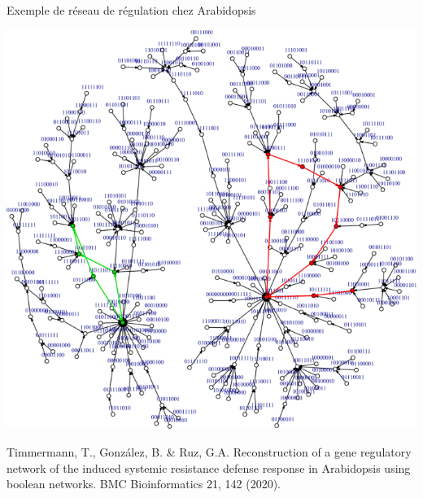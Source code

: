 \begin{frame}{Exemple de réseau de régulation chez Arabidopsis}

\begin{center}
    \includegraphics[scale = 0.27]{Figures/Intro/arabidopsis_gene_network.png} 
\end{center}

\vspace{-0.5cm}

\begin{tiny}
Timmermann, T., González, B. \& Ruz, G.A. Reconstruction of a gene regulatory network of the induced systemic resistance defense response in Arabidopsis using boolean networks. BMC Bioinformatics 21, 142 (2020). 
\end{tiny}

\end{frame}

	
	
